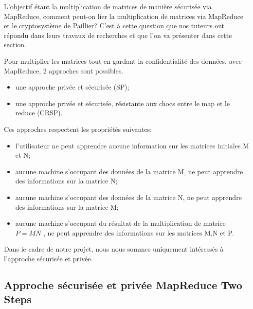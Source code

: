 



L'objectif étant la multiplication de matrices de manière sécurisée via MapReduce, 
comment peut-on lier la multiplication de matrices via MapReduce et le cryptosystème de Paillier?
C'est à cette question que nos tuteurs ont répondu dans leurs travaux de recherches \cite{publi-tuteurs} et que l'on va
présenter dans cette section.\par
\vspace{1\baselineskip}
Pour multiplier les matrices tout en gardant la confidentialité des données, avec MapReduce,
2 approches sont possibles.
\begin{itemize}
\item une approche privée et sécurisée (SP);
\item une approche privée et sécurisée, résistante aux chocs entre le map et le reduce (CRSP).
\end{itemize}
\littlesectionspace
Ces approches respectent les propriétés suivantes:
\begin{itemize}
\item l'utilisateur ne peut apprendre aucune information sur les matrices initiales M et N;
\item aucune machine s'occupant des données de la matrice M, ne peut apprendre des informations 
sur la matrice N;
\item aucune machine s'occupant des données de la matrice N, ne peut apprendre des informations 
sur la matrice M;  
\item aucune machine s'occupant du résultat de la multiplication de matrice $P= MN$ , ne peut 
apprendre des informations sur les matrices M,N et P.
\end{itemize}
Dans le cadre de notre projet, nous nous sommes uniquement intéressés à l'approche sécurisée et privée.
\vspace{1\baselineskip}

\subsection{Approche sécurisée et privée MapReduce Two Steps}

